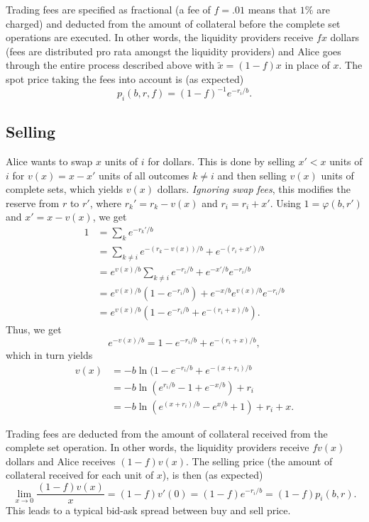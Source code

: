 \documentclass[12pt]{article}
\begin{document}
Trading fees are specified as fractional (a fee of $f = .01$ means that $1\%$ are charged) and deducted from the amount of collateral before the complete set operations are executed. In other words, the liquidity providers receive $fx$ dollars (fees are distributed pro rata amongst the liquidity providers) and Alice goes through the entire process described above with $\tilde x = (1-f)x$ in place of $x$. The spot price taking the fees into account is (as expected)
\[
    p_i(b, r, f) = (1 - f)^{-1}e^{-r_i/b}.
\]

\subsection{Selling}

Alice wants to swap $x$ units of $i$ for dollars. This is done by selling $x' < x$ units of $i$ for $v(x) = x - x'$ units of all outcomes $k \neq i$ and then selling $v(x)$ units of complete sets, which yields $v(x)$ dollars. \emph{Ignoring swap fees}, this modifies the reserve from $r$ to $r'$, where $r_k' = r_k - v(x)$ and $r_i = r_i + x'$. Using $1 = \varphi(b, r')$ and $x' = x - v(x)$, we get
\begin{align*}
    1 &= \sum_k e^{-r_k'/b} \\
    &= \sum_{k \neq i} e^{-(r_k - v(x))/b} + e^{-(r_i + x')/b} \\
    &= e^{v(x)/b} \sum_{k \neq i} e^{-r_i/b} + e^{-x'/b} e^{-r_i/b} \\
    &= e^{v(x)/b} (1 - e^{-r_i/b}) + e^{-x/b} e^{v(x)/b} e^{-r_i/b} \\
    &= e^{v(x)/b} ( 1 - e^{-r_i/b} + e^{-(r_i + x)/b} ).
\end{align*}
Thus, we get
$$
    e^{-v(x)/b} = 1 - e^{-r_i/b} + e^{-(r_i + x)/b},
$$
which in turn yields                                                                                   \begin{align*}
    v(x) &= - b \ln (1 - e^{-r_i/b} + e^{-(x+r_i)/b} \\
    &= -b \ln (e^{r_i/b} - 1 + e^{-x/b}) + r_i \\                                                          &= -b \ln (e^{(x + r_i)/b} - e^{x/b} + 1) + r_i + x.
\end{align*}

Trading fees are deducted from the amount of collateral received from the complete set operation. In other words, the liquidity providers receive $fv(x)$ dollars and Alice receives $(1-f)v(x)$. The selling price (the amount of collateral received for each unit of $x$), is then (as expected)
\[
    \lim_{x \rightarrow 0} \frac{(1-f)v(x)}{x} = (1-f) v'(0) = (1-f) e^{-r_i/b} = (1-f)p_i(b, r).
\]
This leads to a typical bid-ask spread between buy and sell price.
\end{document}
